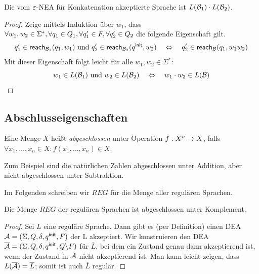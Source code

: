 \begin{lemma}\label{satz:2.ClosedConcatenation}
Die vom $\varepsilon$-NEA für Konkatenation akzeptierte Sprache ist $L(\mathcal{B}_1)\cdot L(\mathcal{B}_2)$.
\end{lemma}
\begin{proof}
 Zeige mittels Induktion über $w_1$, dass $\forall w_1,w_2\in\Sigma^*, \forall q_1\in Q_1, \linebreak[1] \forall q_1'\in F, \forall q_2'\in Q_2$ die folgende Eigenschaft gilt.
 \[
   q_1' \in \textsf{reach}_{\mathcal{B}_1}(q_1,w_1) \text{ und } q_2' \in
   \textsf{reach}_{\mathcal{B}_2}(q^\mathsf{init},w_2) \quad\Leftrightarrow\quad q_2' \in \textsf{reach}_{\mathcal{B}}(q_1,w_1w_2)
 \]
 Mit dieser Eigenschaft folgt leicht für alle $w_1, w_2 \in \Sigma^*$:
 \[
 w_1 \in L(\mathcal{B}_1) \text{ und } w_2 \in L(\mathcal{B}_2) \quad\Leftrightarrow\quad w_1 \cdot w_2 \in L(\mathcal{B})
 \qedhere
 \]
\end{proof}




\subsection{Abschlusseigenschaften}


\begin{Def}[name={[Abgeschlossenheit von $\mathcal{L}$]}]
        Eine Menge $X$ heißt \emph{abgeschlossen} unter Operation $f:X^n \-> X$, falls $\forall x_1,\dots, x_n\in X : f(x_1,\dots, x_n)\in X$.
\end{Def}
Zum Beispiel sind die natürlichen Zahlen abgeschlossen unter Addition, aber nicht abgeschlossen unter Subtraktion.

Im Folgenden schreiben wir $REG$ für die Menge aller regulären Sprachen.

\begin{lemma}\label{satz:2.ClosedComplement}
 Die Menge $REG$ der regulären Sprachen ist abgeschlossen unter Komplement.
\end{lemma}

\begin{proof}
Sei $L$ eine reguläre Sprache. 
Dann gibt es (per Definition) einen \acs*{DEA} $\mathcal{A}=(\Sigma, Q, \delta, q^\mathsf{init}, F)$ der L akzeptiert.
Wir konstruieren den \acs*{DEA} $\overline{\mathcal{A}}=(\Sigma, Q, \delta, q^\mathsf{init}, Q\backslash F)$ für $\overline{L}$, bei dem ein Zustand genau dann akzeptierend ist, wenn der Zustand in $\mathcal{A}$ nicht akzeptierend ist.
Man kann leicht zeigen, dass $L(\overline{\mathcal{A}})=\overline{L}$; somit ist auch $\overline{L}$ regulär.
\end{proof}

